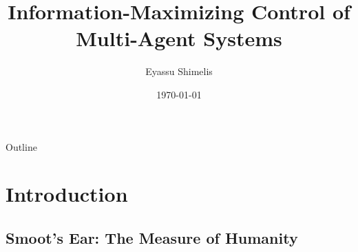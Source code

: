 \documentclass{beamer}
\title{Information-Maximizing Control of Multi-Agent Systems}
\author{Eyassu Shimelis}
\date{\today}
\begin{document}

\frame{\titlepage}

\section[Outline]{}
\begin{frame}{Outline}
  \tableofcontents
\end{frame}

\section{Introduction}
\subsection{Smoot's Ear: The Measure of Humanity}
\end{document}
